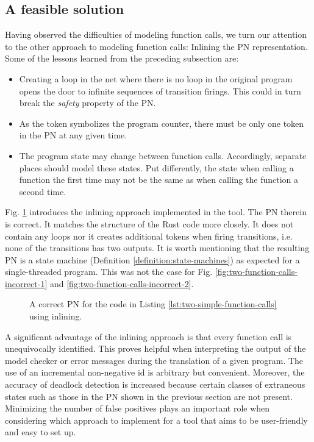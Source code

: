 \clearpage
\subsection{A feasible solution}

Having observed the difficulties of modeling function calls,
we turn our attention to the other approach to modeling function calls:
Inlining the \acrshort{PN} representation.
Some of the lessons learned from the preceding subsection are:

\begin{itemize}
    \item Creating a loop in the net where there is no loop in the original program
          opens the door to infinite sequences of transition firings.
          This could in turn break the \emph{safety} property of the \acrshort{PN}.
    \item As the token symbolizes the program counter,
          there must be only one token in the \acrshort{PN} at any given time.
    \item The program state may change between function calls.
          Accordingly, separate places should model these states.
          Put differently, the state when calling a function the first time
          may not be the same as when calling the function a second time.
\end{itemize}

Fig. \ref{fig:two-function-calls-correct} introduces
the inlining approach implemented in the tool.
The \acrshort{PN} therein is correct.
It matches the structure of the Rust code more closely.
It does not contain any loops nor
it creates additional tokens when firing transitions,
i.e. none of the transitions has two outputs.
It is worth mentioning that the resulting \acrshort{PN} is a state machine
(Definition \ref{definition:state-machines})
as expected for a single-threaded program.
This was not the case for Fig. \ref{fig:two-function-calls-incorrect-1}
and \ref{fig:two-function-calls-incorrect-2}.

\begin{figure}[!htbp]
    \centering
    
    \caption{A correct \acrshort{PN} for the code
        in Listing \ref{lst:two-simple-function-calls} using inlining.}
    \label{fig:two-function-calls-correct}
\end{figure}

A significant advantage of the inlining approach is
that every function call is unequivocally identified.
This proves helpful when interpreting the output of the model checker or
error messages during the translation of a given program.
The use of an incremental non-negative id is arbitrary but convenient.
Moreover, the accuracy of deadlock detection is increased because
certain classes of extraneous states
such as those in the \acrshort{PN} shown in the previous section
are not present.
Minimizing the number of false positives plays an important role
when considering which approach to implement
for a tool that aims to be user-friendly and easy to set up.

